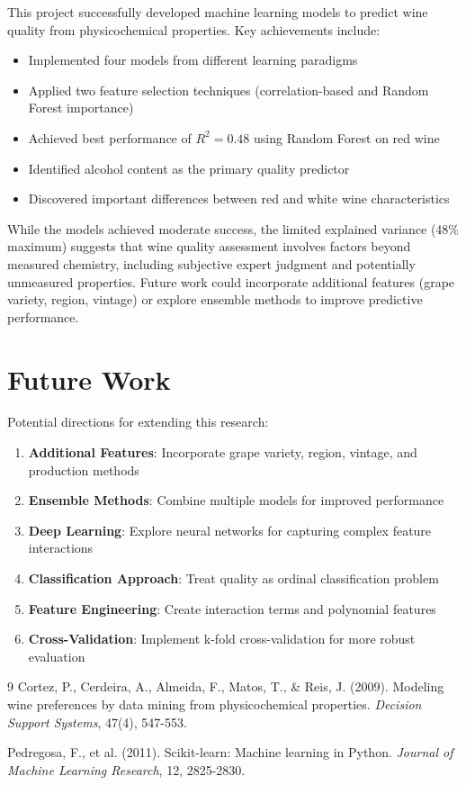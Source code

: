 \documentclass[12pt]{article}
\begin{document}
This project successfully developed machine learning models to predict wine quality from physicochemical properties. Key achievements include:

\begin{itemize}
    \item Implemented four models from different learning paradigms
    \item Applied two feature selection techniques (correlation-based and Random Forest importance)
    \item Achieved best performance of $R^2 = 0.48$ using Random Forest on red wine
    \item Identified alcohol content as the primary quality predictor
    \item Discovered important differences between red and white wine characteristics
\end{itemize}

While the models achieved moderate success, the limited explained variance (48\% maximum) suggests that wine quality assessment involves factors beyond measured chemistry, including subjective expert judgment and potentially unmeasured properties. Future work could incorporate additional features (grape variety, region, vintage) or explore ensemble methods to improve predictive performance.

\section{Future Work}

Potential directions for extending this research:
\begin{enumerate}
    \item \textbf{Additional Features}: Incorporate grape variety, region, vintage, and production methods
    \item \textbf{Ensemble Methods}: Combine multiple models for improved performance
    \item \textbf{Deep Learning}: Explore neural networks for capturing complex feature interactions
    \item \textbf{Classification Approach}: Treat quality as ordinal classification problem
    \item \textbf{Feature Engineering}: Create interaction terms and polynomial features
    \item \textbf{Cross-Validation}: Implement k-fold cross-validation for more robust evaluation
\end{enumerate}

\begin{thebibliography}{9}
Cortez, P., Cerdeira, A., Almeida, F., Matos, T., \& Reis, J. (2009). Modeling wine preferences by data mining from physicochemical properties. \textit{Decision Support Systems}, 47(4), 547-553.

Pedregosa, F., et al. (2011). Scikit-learn: Machine learning in Python. \textit{Journal of Machine Learning Research}, 12, 2825-2830.
\end{thebibliography}
\end{document}
